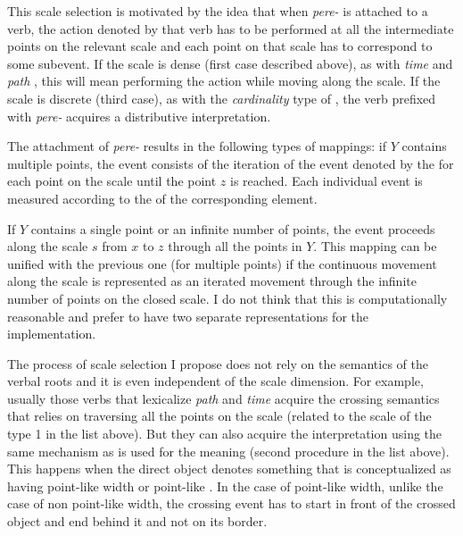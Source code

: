 This scale selection is motivated by the idea that when \textit{pere-} is attached to a verb, the action denoted by that verb has to be performed at all the intermediate points on the relevant scale and each point on that scale has to correspond to some subevent. If the scale is dense (first case described above), as with \textit{time} and \textit{path} , this will mean performing the action while moving along the scale. If the scale is discrete (third case), as with the \textit{cardinality} type of , the verb prefixed with \textit{pere-} acquires a distributive interpretation. 

The attachment of \textit{pere-} results in the following types of mappings: %
if $Y$ contains multiple points, the event consists of the iteration of the event denoted by the  for each point on the scale until the point $z$ is reached. Each individual event is measured according to the  of the corresponding element.

If $Y$ contains a single point or an infinite number of points, the event proceeds along the scale $s$ from $x$ to $z$ through all the points in $Y$. This mapping can be unified with the previous one (for multiple points) if the continuous movement along the scale is represented as an iterated movement through the infinite number of points on the closed scale. I do not think that this is computationally reasonable and prefer to have two separate representations for the implementation.

The process of scale selection I propose does not rely on the semantics of the verbal roots and it is even independent of the scale dimension. For example, usually those verbs that lexicalize \textit{path} and \textit{time}  acquire the crossing semantics that relies on traversing all the points on the scale (related to the scale of the type 1 in the list above). But they can also acquire the interpretation using the same mechanism as is used for the  meaning (second procedure in the list above). This happens when the direct object denotes something that is conceptualized as having point-like width or point-like . In the case of point-like width, unlike the case of non point-like width, the crossing event has to start in front of the crossed object and end behind it and not on its border.


